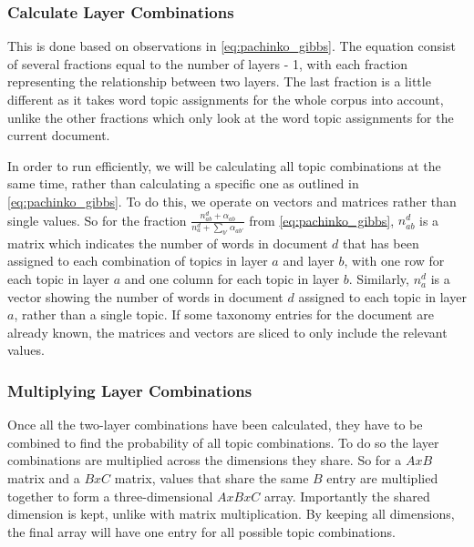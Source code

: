 \subsubsection{Calculate Layer Combinations}\label{app:calculate_layer_combs}
This is done based on observations in \autoref{eq:pachinko_gibbs}.
The equation consist of several fractions equal to the number of layers - 1, with each fraction representing the relationship between two layers.
The last fraction is a little different as it takes word topic assignments for the whole corpus into account, unlike the other fractions which only look at the word topic assignments for the current document.

In order to run efficiently, we will be calculating all topic combinations at the same time, rather than calculating a specific one as outlined in \autoref{eq:pachinko_gibbs}.
To do this, we operate on vectors and matrices rather than single values.
So for the fraction $\frac{n_{ab}^d + \alpha_{ab}}{n_a^d + \sum_{b'} \alpha_{ab'}}$ from \autoref{eq:pachinko_gibbs}, $n_{ab}^d$ is a matrix which indicates the number of words in document $d$ that has been assigned to each combination of topics in layer $a$ and layer $b$, with one row for each topic in layer $a$ and one column for each topic in layer $b$.
Similarly, $n_a^d$ is a vector showing the number of words in document $d$ assigned to each topic in layer $a$, rather than a single topic.
If some taxonomy entries for the document are already known, the matrices and vectors are sliced to only include the relevant values.

\subsubsection{Multiplying Layer Combinations}
Once all the two-layer combinations have been calculated, they have to be combined to find the probability of all topic combinations.
To do so the layer combinations are multiplied across the dimensions they share.
So for a $AxB$ matrix and a $BxC$ matrix, values that share the same $B$ entry are multiplied together to form a three-dimensional $AxBxC$ array.
Importantly the shared dimension is kept, unlike with matrix multiplication.
By keeping all dimensions, the final array will have one entry for all possible topic combinations.

